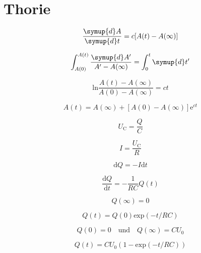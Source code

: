 \section{Thorie}

    \begin{equation}
        \frac{\symup{d}A}{\symup{d}t}=c[A(t)-A(\infty)]
    \end{equation}

    \begin{equation}
        \int_{A(0)}^{A(t)} \frac{\symup{d}A'}{A' - A(\infty)} = \int_0^t \symup{d}t'
    \end{equation}

    \begin{equation}
        \text{ln} \frac{A(t) - A(\infty)}{A(0) - A(\infty)} = ct
    \end{equation}

    \begin{equation}
        A(t) = A(\infty) + [A(0) - A(\infty)] \text{e}^{ct}
    \end{equation}

    \begin{equation}
        U_{\text{C}} = \frac{Q}{C}
    \end{equation}

    \begin{equation}
        I = \frac{U_{\text{C}}}{R}
    \end{equation}

    \begin{equation}
        \text{d}Q = -I \text{d}t
    \end{equation}

    \begin{equation}
        \frac{\text{d}Q}{\text{d}t} = - \frac{1}{RC} Q(t)
    \end{equation}

    \begin{equation}
        Q(\infty) = 0
    \end{equation}

    \begin{equation}
        Q(t) = Q(0) \text{exp}(-t/RC)
    \end{equation}

    \begin{equation}
        Q(0) = 0 \quad \text{und} \quad Q(\infty) = CU_0 
    \end{equation}

    \begin{equation}
        Q(t) = CU_0(1- \text{exp}(-t/RC))
    \end{equation}

